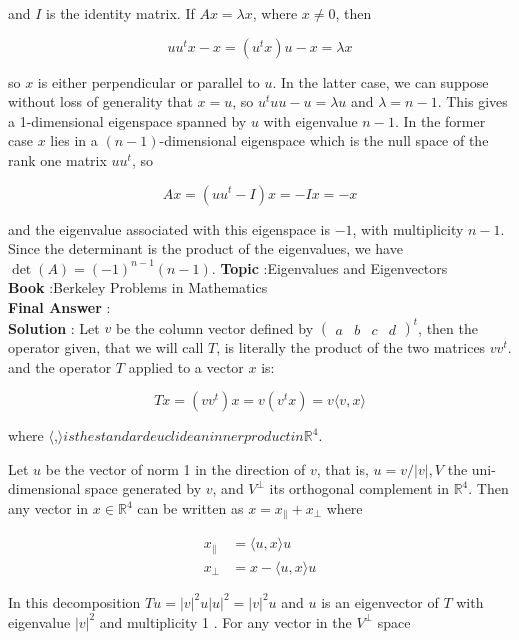 \documentclass[10pt]{article}
\begin{document}
and $I$ is the identity matrix. If $A x=\lambda x$, where $x \neq 0$, then

$$
u u^{t} x-x=\left(u^{t} x\right) u-x=\lambda x
$$

so $x$ is either perpendicular or parallel to $u$. In the latter case, we can suppose without loss of generality that $x=u$, so $u^{t} u u-u=\lambda u$ and $\lambda=n-1$. This gives a 1-dimensional eigenspace spanned by $u$ with eigenvalue $n-1$. In the former case $x$ lies in a $(n-1)$-dimensional eigenspace which is the null space of the rank one matrix $u u^{t}$, so

$$
A x=\left(u u^{t}-I\right) x=-I x=-x
$$

and the eigenvalue associated with this eigenspace is $-1$, with multiplicity $n-1$. Since the determinant is the product of the eigenvalues, we have $\operatorname{det}(A)=(-1)^{n-1}(n-1)$.
\textbf{Topic} :Eigenvalues and Eigenvectors \\
\textbf{Book} :Berkeley Problems in Mathematics\\
\textbf{Final Answer} :\\


\textbf{Solution} : Let $v$ be the column vector defined by $\left(\begin{array}{llll}a & b & c & d\end{array}\right)^{t}$, then the operator given, that we will call $T$, is literally the product of the two matrices $v v^{t}$. and the operator $T$ applied to a vector $x$ is:

$$
T x=\left(v v^{t}\right) x=v\left(v^{t} x\right)=v\langle v, x\rangle
$$

where $\langle$,$\rangle is the standard euclidean inner product in \mathbb{R}^{4}$.

Let $u$ be the vector of norm 1 in the direction of $v$, that is, $u=v /|v|, V$ the uni-dimensional space generated by $v$, and $V^{\perp}$ its orthogonal complement in $\mathbb{R}^{4}$. Then any vector in $x \in \mathbb{R}^{4}$ can be written as $x=x_{\|}+x_{\perp}$ where

$$
\begin{aligned}
x_{\|} &=\langle u, x\rangle u \\
x_{\perp} &=x-\langle u, x\rangle u
\end{aligned}
$$

In this decomposition $T u=|v|^{2} u|u|^{2}=|v|^{2} u$ and $u$ is an eigenvector of $T$ with eigenvalue $|v|^{2}$ and multiplicity 1 . For any vector in the $V^{\perp}$ space
\end{document}
